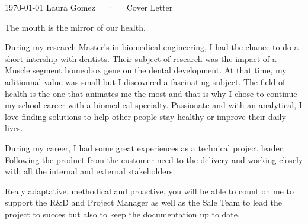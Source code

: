 \documentclass[11pt, a4paper]{awesome-cv}
\begin{document}
\makecvheader[R]

\makecvfooter
  {\today}
  {Laura Gomez~~~·~~~Cover Letter}
  {}

\makelettertitle

\begin{cvletter}


The mouth is the mirror of our health.

During my research Master's in biomedical engineering, I had the chance to do a short intership with dentists. 
Their subject of research was the impact of a Muscle segment homeobox gene on the dental development. 
At that time, my aditionnal value was small but I discovered a fascinating subject. 
The field of health is the one that animates me the most and that is why I chose to continue my school career with a biomedical specialty. 
Passionate and with an analytical, I love finding solutions to help other people stay healthy or improve their daily lives.

During my career, I had some great experiences as a technical project leader. 
Following the product from the customer need to the delivery and working closely with all the internal and external stakeholders.

Realy adaptative, methodical and proactive, you will be able to count on me to support the R\&D and Project Manager as well as the Sale Team
to lead the project to succes but also to keep the documentation up to date. 



\end{cvletter}
\end{document}
